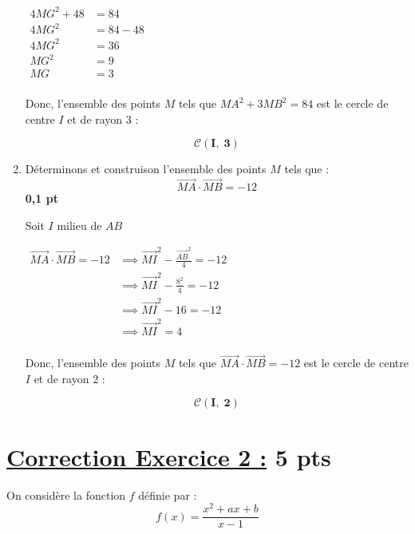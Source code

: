 \documentclass[12pt,a4paper]{article}
\begin{document}
\begin{enumerate}
		    \(
    \begin{aligned}
    		4MG^2+48 &= 84\\
        4MG^2 &= 84-48\\  
         4MG^2 &=36\\
         MG^2 &=9\\
         MG &=3\\
    \end{aligned}
    \)    
    
    Donc, l'ensemble des points \( M \) tels que \( MA^2 + 3MB^2 = 84 \) est le cercle de centre \( I \) et de rayon \( 3 \) :   
    		    \begin{resultbox}
            \[
                \mathbf{\mathscr{C}(I,\;3) }
            \]
					\end{resultbox} 
    
    \item Déterminons et construison l'ensemble des points \( M \) tels que :
    \[
    \overrightarrow{MA}\cdot\overrightarrow{MB} = -12
    \]
    \hfill \textbf{0{,}1 pt}

		Soit \(I\) milieu de \(AB\)  
		
		\(		
		\begin{aligned}
			\overrightarrow{MA} \cdot \overrightarrow{MB} = -12 &\implies \overrightarrow{MI}^{2}-\frac{\overrightarrow{AB}^{2}}{4} = -12\\
			&\implies \overrightarrow{MI}^{2}-\frac{8^{2}}{4} = -12\\
			&\implies \overrightarrow{MI}^{2}-16 = -12\\
			&\implies \overrightarrow{MI}^{2} = 4\\
		\end{aligned}
		\)  

Donc, l'ensemble des points \( M \) tels que \( \overrightarrow{MA} \cdot \overrightarrow{MB} = -12 \) est le cercle de centre \( I \) et de rayon \( 2 \) :   
    		    \begin{resultbox}
            \[
                \mathbf{\mathscr{C}(I,\;2) }
            \]
					\end{resultbox}  
\end{enumerate}

\section*{\underline{Correction Exercice 2 :} 5 pts }

On considère la fonction \( f \) définie par :
\[
f(x) = \frac{x^2 + ax + b}{x - 1}
\]
\end{document}

